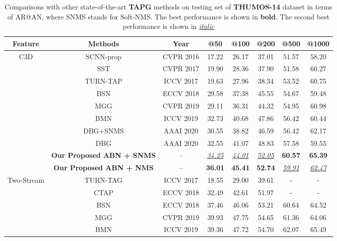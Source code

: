 \documentclass{ieeeaccess}
\begin{document}
\begin{table*}[t]
\centering
\caption{Comparisons with other state-of-the-art \textbf{TAPG} methods on testing set of \textbf{THUMOS-14} dataset in terms of AR@AN, where SNMS stands for Soft-NMS. The best performance is shown in \textbf{bold}. The second best performance is shown in \underline{\textit{italic}}}
\begin{tabular}{c| c c c c c c c }
\toprule
Feature  & Methods & Year & @50 & @100 & @200 & @500 & @1000              \\
\hline
\hline
\multirow{10}{*}{C3D}
& SCNN-prop \cite{anchor_2} &CVPR 2016 & 17.22 & 26.17 & 37.01 & 51.57 & 58.20        \\
& SST \cite{SST_CVPR2017} & CVPR 2017 & 19.90 & 28.36 & 37.90 & 51.58 & 60.27        \\
& TURN-TAP \cite{anchor_3} & ICCV 2017 & 19.63 & 27.96 & 38.34 & 53.52 & 60.75        \\
& BSN \cite{lin2018bsn} & ECCV 2018 & 29.58 & 37.38 & 45.55 & 54.67 & 59.48     \\
& MGG \cite{liu2019multi} & CVPR 2019 & 29.11 & 36.31 & 44.32 & 54.95 & 60.98        \\
& BMN \cite{bmn} & ICCV 2019 & 32.73 & 40.68 & 47.86 & 56.42 & 60.44     \\
& DBG+SNMS \cite{dbg} &  AAAI 2020 &   30.55 & 38.82 & 46.59 & 56.42 & 62.17     \\ 
& DBG \cite{dbg} &  AAAI 2020 &   32.55 & 41.07 & 48.83 & 57.58 & 59.55     \\ 
\cline{2-8}
& \textbf{Our Proposed ABN + SNMS} & -- & \underline{\textit{34.25}} & \underline{\textit{44.01}} & \underline{\textit{52.05}} & \textbf{60.57} & \textbf{65.39} \\
& \textbf{Our Proposed ABN + NMS} & --
& \textbf{36.01} & \textbf{45.41} & \textbf{52.74} & \underline{\textit{59.91}} & \underline{\textit{62.47}} \\
\hline
\hline
\multirow{9}{*}{Two-Stream}
& TURN-TAG \cite{anchor_3}     &  ICCV 2017 & 18.55 & 29.00 & 39.61 & - & -                \\
& CTAP  \cite{CTAP}  & ECCV 2018  & 32.49 & 42.61 & 51.97 & - & -                \\
& BSN \cite{lin2018bsn} & ECCV 2018 & 37.46 & 46.06 & 53.21 & 60.64 & 64.52          \\
& MGG  \cite{liu2019multi}  & CVPR 2019   & 39.93 & 47.75 & 54.65 & 61.36 & 64.06        \\
& BMN \cite{bmn}& ICCV 2019 &    39.36 & 47.72 & 54.70 & 62.07 & 65.49     \\

\end{tabular}
\end{table*}
\end{document}
